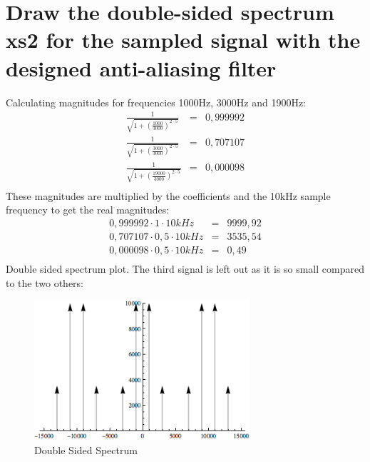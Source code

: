 \documentclass[a4wide,10pt]{article}
\begin{document}
\section{Draw the double-sided spectrum xs2 for the sampled signal with the designed anti-aliasing filter} %
\label{sec:draw_the_double_sided_spectrum_xs2_for_the_sampled_signal_with_the_designed_anti_aliasing_filter}
Calculating magnitudes for frequencies 1000Hz, 3000Hz and 1900Hz:
\begin{eqnarray}
	\frac{1}{\sqrt{1+(\frac{1000}{3000})^{2\cdot 5}}} &=& 0,999992 \nonumber \\
	\frac{1}{\sqrt{1+(\frac{3000}{3000})^{2\cdot 5}}} &=& 0,707107 \nonumber \\
	\frac{1}{\sqrt{1+(\frac{19000}{3000})^{2\cdot 5}}} &=& 0,000098 \nonumber \\
\end{eqnarray}
These magnitudes are multiplied by the coefficients and the 10kHz sample frequency to get the real magnitudes:
\begin{eqnarray}
	0,999992 \cdot 1 \cdot 10kHz &=& 9999,92 \nonumber \\
	0,707107 \cdot 0,5 \cdot 10kHz &=& 3535,54 \nonumber \\
	0,000098 \cdot 0,5 \cdot 10kHz &=& 0,49 \nonumber \\
\end{eqnarray}
Double sided spectrum plot. The third signal is left out as it is so small compared to the two others:
\begin{figure}[htbp]
	\centering
		\includegraphics[width=8cm]{images/double-sided-spectrum-3.png}
	\caption{Double Sided Spectrum}
	\label{fig:images_double-sided-spectrum-3}
\end{figure}
\newpage
\end{document}
